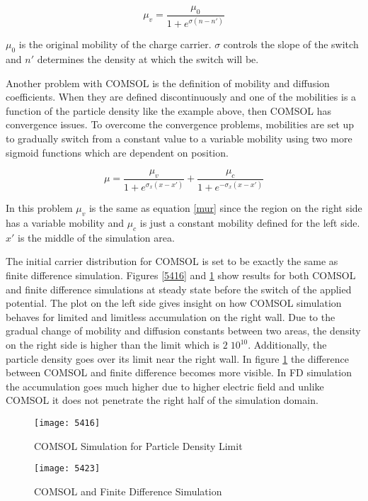 \begin{doublespace}
\begin{equation}
\mu_v = \frac{\mu_{0}}{1+e^{\sigma(n-n')}}
\label{mur}
\end{equation} 

$\mu_0$ is the original mobility of the charge carrier. $\sigma$ controls the slope of the switch and $n'$ determines the density at which the switch will be. 

Another problem with COMSOL is the definition of mobility and diffusion coefficients. When they are defined discontinuously and one of the mobilities is a function of the particle density like the example above, then COMSOL has convergence issues. To overcome the convergence problems, mobilities are set up to gradually switch from a constant value to a variable mobility using two more sigmoid functions which are dependent on position.

\begin{equation}
\mu=\frac{\mu_{v}}{1+e^{\sigma_x(x-x')}}+\frac{\mu_{c}}{1+e^{-\sigma_x(x-x')}}
\end{equation}

In this problem $\mu_v$ is the same as equation \ref{mur} since the region on the right side has a variable mobility and $\mu_c$ is just a constant mobility defined for the left side. $x'$ is the middle of the simulation area.

The initial carrier distribution for COMSOL is set to be exactly the same as finite difference simulation. Figures \ref{5416} and \ref{5423} show results for both COMSOL and finite difference simulations at steady state before the switch of the applied potential. The plot on the left side gives insight on how COMSOL simulation behaves for limited and limitless accumulation on the right wall. Due to the gradual change of mobility and diffusion constants between two areas, the density on the right side is higher than the limit which is $2 \; 10^{10}$. Additionally, the particle density goes over its limit near the right wall. In figure \ref{5423} the difference between COMSOL and finite difference becomes more visible. In FD simulation the accumulation goes much higher due to higher electric field and unlike COMSOL it does not penetrate the right half of the simulation domain. 

\begin{figure}[ht]
\centering
\begin{minipage}[b]{0.45\linewidth}
\texttt{[image: 5416]}
\caption{COMSOL Simulation for Particle Density Limit}
\label{5416}
\end{minipage}
\quad
\begin{minipage}[b]{0.45\linewidth}
\texttt{[image: 5423]}
\caption{COMSOL and Finite Difference Simulation}
\label{5423}
\end{minipage}
\end{figure}


\end{doublespace}
